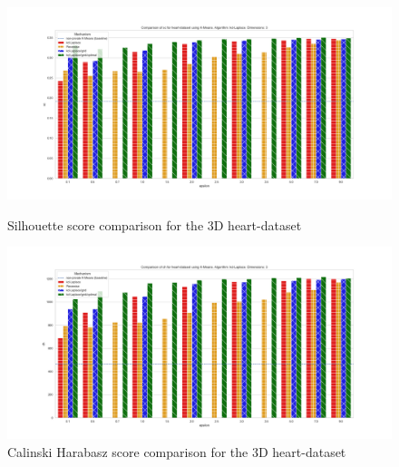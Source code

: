 \begin{figure}[H]
    \centering
    \begin{minipage}[c]{0.8\textwidth}
        \includegraphics[width=1\textwidth]{Results/RQ2/heart-dataset/sc_heart-dataset_comparison.png}
        \caption{Silhouette score comparison for the 3D heart-dataset}
        \label{fig:appendix-sc_heart-dataset_comparison_3d}
    \end{minipage}
    \begin{minipage}[c]{0.8\textwidth}
        \includegraphics[width=1\textwidth]{Results/RQ2/heart-dataset/ch_heart-dataset_comparison.png}
        \caption{Calinski Harabasz score comparison for the 3D heart-dataset}
        \label{fig:appendix-ch_heart-dataset_comparison_3d}
    \end{minipage}

\end{figure}
